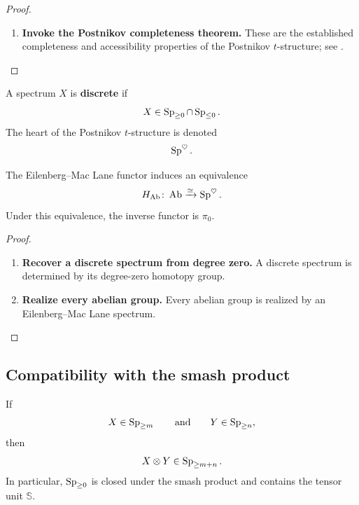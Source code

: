 \begin{proof}
\leavevmode
\begin{enumerate}[label=\textup{(\arabic*)}]
    \item \textbf{Invoke the Postnikov completeness theorem.}
    These are the established completeness and accessibility properties of the
    Postnikov $t$-structure; see \cite{LurieHigherAlgebra}.
\end{enumerate}
\end{proof}

\begin{definition}
\label{def:discrete-spectrum}
A spectrum $X$ is \textbf{discrete} if
\[
    X\in\operatorname{Sp}_{\geq0}\cap\operatorname{Sp}_{\leq0}.
\]
The heart of the Postnikov $t$-structure is denoted
\[
    \operatorname{Sp}^\heartsuit.
\]
\end{definition}

\begin{proposition}
\label{prop:eilenberg-mac-lane-heart}
The Eilenberg--Mac Lane functor induces an equivalence
\[
    H_{\mathrm{Ab}}
    \colon
    \operatorname{Ab}
    \xrightarrow{\simeq}
    \operatorname{Sp}^\heartsuit.
\]
Under this equivalence, the inverse functor is $\pi_0$.
\end{proposition}

\begin{proof}
\leavevmode
\begin{enumerate}[label=\textup{(\arabic*)}]
    \item \textbf{Recover a discrete spectrum from degree zero.}
    A discrete spectrum is determined by its degree-zero homotopy group.

    \item \textbf{Realize every abelian group.}
    Every abelian group is realized by an Eilenberg--Mac Lane spectrum.
\end{enumerate}
\end{proof}

\subsection{Compatibility with the smash product}

\begin{proposition}
\label{prop:smash-product-connectivity}
If
\[
    X\in\operatorname{Sp}_{\geq m}
    \qquad\text{and}\qquad
    Y\in\operatorname{Sp}_{\geq n},
\]
then
\[
    X\otimes Y
    \in
    \operatorname{Sp}_{\geq m+n}.
\]
In particular, $\operatorname{Sp}_{\geq0}$ is closed under the smash product and contains
the tensor unit $\mathbb S$.
\end{proposition}

